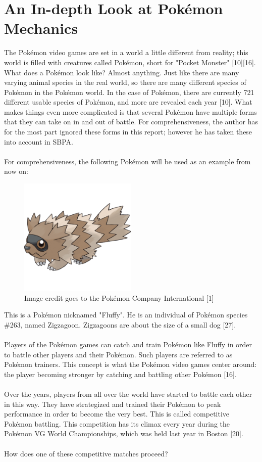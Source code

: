 \documentclass{article}
\begin{document}
\section{An In-depth Look at Pok\'emon Mechanics}
The Pok\'emon video games are set in a world a little different from reality; this world is filled with creatures called Pok\'emon, short for "Pocket Monster" [10][16]. What does a Pok\'emon look like? Almost anything. Just like there are many varying animal species in the real world, so there are many different species of Pok\'emon in the Pok\'emon world. In the case of Pok\'emon, there are currently 721 different usable species of Pok\'emon, and more are revealed each year [10]. What makes things even more complicated is that several Pok\'emon have multiple forms that they can take on in and out of battle. For comprehensiveness, the author has for the most part ignored these forms in this report; however he has taken these into account in SBPA.\\\\
For comprehensiveness, the following Pok\'emon will be used as an example from now on:
\begin{figure}[H]
	\includegraphics[width=0.5\textwidth]{fluffy.png}
	\centering
	\caption{Image credit goes to the Pok\'emon Company International [1]}
\end{figure}
This is a Pok\'emon nicknamed "Fluffy". He is an individual of Pok\'emon species \#263, named Zigzagoon. Zigzagoons are about the size of a small dog [27].\\\\
Players of the Pok\'emon games can catch and train Pok\'emon like Fluffy in order to battle other players and their Pok\'emon. Such players are referred to as Pok\'emon trainers. This concept is what the Pok\'emon video games center around: the player becoming stronger by catching and battling other Pok\'emon [16].\\\\
Over the years, players from all over the world have started to battle each other in this way. They have strategized and trained their Pok\'emon to peak performance in order to become the very best. This is called competitive Pok\'emon battling. This competition has its climax every year during the Pok\'emon VG World Championships, which was held last year in Boston [20].\\\\
How does one of these competitive matches proceed?
\end{document}
